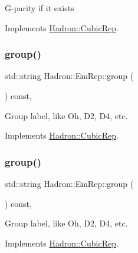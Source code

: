 G-\/parity if it exists 

Implements \mbox{\hyperlink{structHadron_1_1CubicRep_a52104e43266d1614c00bbd1c3b395458}{Hadron\+::\+Cubic\+Rep}}.

\mbox{\label{structHadron_1_1EmRep_adc28161832b89ed8222fcc7ce5928781}} 
\subsubsection{\texorpdfstring{group()}{group()}\hspace{0.1cm}{\footnotesize\ttfamily [1/3]}}
{\footnotesize\ttfamily std\+::string Hadron\+::\+Em\+Rep\+::group (\begin{DoxyParamCaption}{ }\end{DoxyParamCaption}) const\hspace{0.3cm}{\ttfamily [inline]}, {\ttfamily [virtual]}}

Group label, like Oh, D2, D4, etc. 

Implements \mbox{\hyperlink{structHadron_1_1CubicRep_a0748f11ec87f387062c8e8981339a29c}{Hadron\+::\+Cubic\+Rep}}.

\mbox{\label{structHadron_1_1EmRep_adc28161832b89ed8222fcc7ce5928781}} 
\subsubsection{\texorpdfstring{group()}{group()}\hspace{0.1cm}{\footnotesize\ttfamily [2/3]}}
{\footnotesize\ttfamily std\+::string Hadron\+::\+Em\+Rep\+::group (\begin{DoxyParamCaption}{ }\end{DoxyParamCaption}) const\hspace{0.3cm}{\ttfamily [inline]}, {\ttfamily [virtual]}}

Group label, like Oh, D2, D4, etc. 

Implements \mbox{\hyperlink{structHadron_1_1CubicRep_a0748f11ec87f387062c8e8981339a29c}{Hadron\+::\+Cubic\+Rep}}.

\mbox{\label{structHadron_1_1EmRep_adc28161832b89ed8222fcc7ce5928781}} 
